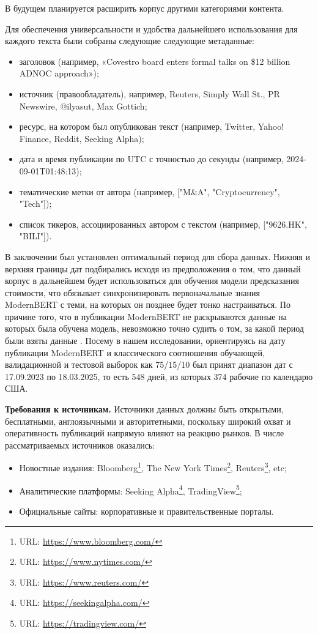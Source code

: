 В будущем планируется расширить корпус другими категориями контента.

Для обеспечения универсальности и удобства дальнейшего использования для каждого текста были собраны следующие следующие метаданные:

\begin{itemize}
    \item заголовок (например, «Covestro board enters formal talks on \$12 billion ADNOC approach»);
    \item источник (правообладатель), например, Reuters, Simply Wall St., PR Newswire, @ilyasut, Max Gottich;
    \item ресурс, на котором был опубликован текст (например, Twitter, Yahoo! Finance, Reddit, Seeking Alpha);
    \item дата и время публикации по UTC с точностью до секунды (например, 2024-09-01T01:48:13);
    \item тематические метки от автора (например, ["M\&A", "Cryptocurrency", "Tech"]);
    \item список тикеров, ассоциированных автором с текстом (например, ["9626.HK", "BILI"]).
\end{itemize}

В заключении был установлен оптимальный период для сбора данных. Нижняя и верхняя границы дат подбирались
исходя из предположения о том, что данный корпус в дальнейшем будет использоваться для обучения модели предсказания
стоимости, что обязывает синхронизировать первоначальные знания ModernBERT с теми, на которых он позднее будет
тонко настраиваться. По причине того, что в публикации ModernBERT не раскрываются данные на которых была обучена
модель, невозможно точно судить о том, за какой период были взяты данные \parencite{Warner2024ModernBERT}. Посему в нашем исследовании, ориентируясь
на дату публикации ModernBERT \parencite{Warner2024ModernBERT} и классического соотношения обучающей, валидационной и тестовой выборок как 75/15/10
был принят диапазон дат с 17.09.2023 по 18.03.2025, то есть 548 дней, из которых 374 рабочие по календарю США.

\textbf{Требования к источникам.} Источники данных должны быть открытыми, бесплатными, англоязычными и авторитетными,
поскольку широкий охват и оперативность публикаций напрямую влияют на реакцию рынков. В числе рассматриваемых
источников оказались:

\begin{itemize}
    \item Новостные издания: Bloomberg\footnote{URL: \url{https://www.bloomberg.com/}},
    The New York Times\footnote{URL: \url{https://www.nytimes.com/}},
    Reuters\footnote{URL: \url{https://www.reuters.com/}}, etc;
    \item Аналитические платформы: Seeking Alpha\footnote{URL: \url{https://seekingalpha.com/}},
    TradingView\footnote{URL: \url{https://tradingview.com/}};
    \item Официальные сайты: корпоративные и правительственные порталы.
\end{itemize}

